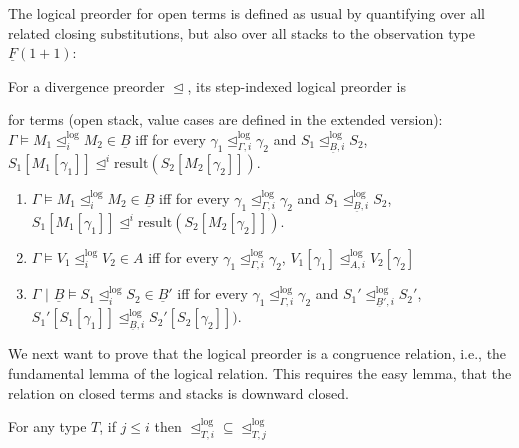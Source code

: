 \documentclass[acmsmall,nonacm]{acmart}
\renewcommand{\u}{\underline}
\newcommand{\pipe}{\,\,|\,\,}
\newcommand{\apreorder}{\trianglelefteq}
\newcommand{\ix}[2]{\mathrel{#1^{#2}}}
\newcommand{\itylrof}[3]{\ilrof{#1}{#3,#2}}
\newcommand{\ilrof}[2]{\mathrel{{#1}^{\text{log}}_{#2}}}
\newcommand{\result}{\text{result}}
\begin{document}
{The logical preorder for open terms is defined as usual by quantifying
over all related closing substitutions, but also over all stacks to the
observation type $\u F (1+1)$:
%
\begin{definition}
  For a divergence preorder $\apreorder$, its step-indexed logical
  preorder is
  \begin{shortonly}
    for terms (open stack, value cases are defined in the extended version):
    $\Gamma \vDash M_1 \ilrof\apreorder{i} M_2 \in \u B$ iff for every $\gamma_1 \itylrof\apreorder i {\Gamma} \gamma_2$ and $S_1
    \itylrof\apreorder i {\u B} S_2$, $S_1[M_1[\gamma_1]] \ix\apreorder
    i \result(S_2[M_2[\gamma_2]])$.
  \end{shortonly}
  \begin{longonly}
  \begin{enumerate}
  \item $\Gamma \vDash M_1 \ilrof\apreorder{i} M_2 \in \u B$ iff for every $\gamma_1 \itylrof\apreorder i {\Gamma} \gamma_2$ and $S_1
    \itylrof\apreorder i {\u B} S_2$, $S_1[M_1[\gamma_1]] \ix\apreorder
    i \result(S_2[M_2[\gamma_2]])$.
  \item $\Gamma \vDash V_1 \ilrof\apreorder{i} V_2 \in A$ iff
    for every $\gamma_1 \itylrof\apreorder i {\Gamma} \gamma_2$, $V_1[\gamma_1] \itylrof\apreorder i A V_2[\gamma_2]$
  \item $\Gamma \pipe \u B \vDash S_1 \ilrof\apreorder{i} S_2 \in \u B'$ 
    iff for every $\gamma_1 \itylrof\apreorder i {\Gamma} \gamma_2$ and
    $S_1' \itylrof\apreorder i {\u B'} S_2'$, $S_1'[S_1[\gamma_1]] \itylrof \apreorder
    i {\u B} S_2'[S_2[\gamma_2]])$.
  \end{enumerate}    
  \end{longonly}
\end{definition}

\begin{longonly}
We next want to prove that the logical preorder is a congruence
relation, i.e., the fundamental lemma of the logical relation.
%
This requires the easy lemma, that the relation on closed terms and
stacks is downward closed.
\begin{lemma}
  For any type $T$, if $j \leq i$ then $\itylrof\apreorder i T
  \subseteq \itylrof\apreorder j T$
\end{lemma}
\end{longonly}

}
\end{document}
